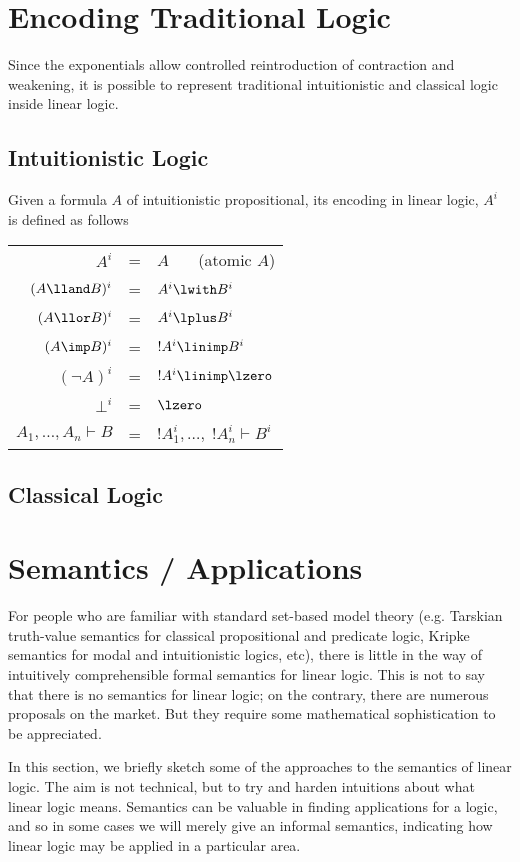 \section{Encoding Traditional Logic}

Since the exponentials allow controlled reintroduction of contraction and
weakening, it is possible to represent traditional intuitionistic and
classical logic inside linear logic.

\subsection{Intuitionistic Logic}
Given a formula $A$ of intuitionistic propositional, its encoding in
linear logic, $A^i$ is defined as follows
\begin{center}
\begin{tabular}{rcl}
$A^i$ & = & $A$ \ \ \ (atomic $A$)\\
$(A\lland B)^i$ & = & $A^i \lwith B^i$\\
$(A\llor B)^i$ & = & $A^i \lplus B^i$\\
$(A\imp B)^i$ & = & $!A^i \linimp B^i$\\
$(\neg A)^i$ & = & $!A^i \linimp \lzero$\\
$\bot^i$ & = & $\lzero$\\
$A_1,\ldots,A_n\vdash B$ & = & $!A_1^i,\ldots,\;!A_n^i\vdash B^i$
\end{tabular}
\end{center}

\subsection{Classical Logic}


\section{Semantics / Applications}

 
For people who are familiar with standard set-based model theory
(e.g. Tarskian truth-value semantics for classical propositional and
predicate logic, Kripke semantics for modal and intuitionistic logics,
etc), there is little in the way of intuitively comprehensible
formal semantics for linear logic. This is not to say that there
is no semantics for linear logic; on the contrary, there are numerous
proposals on the market. But they require some
mathematical sophistication to be appreciated.  

  In this section, we briefly
sketch some of the approaches to the semantics of linear logic.
The aim is not technical, but to try and harden intuitions about
what linear logic means.   Semantics can be valuable
in finding applications for a logic, and so in some cases we will
merely give an informal semantics, indicating how linear logic may
be applied in a particular area.


